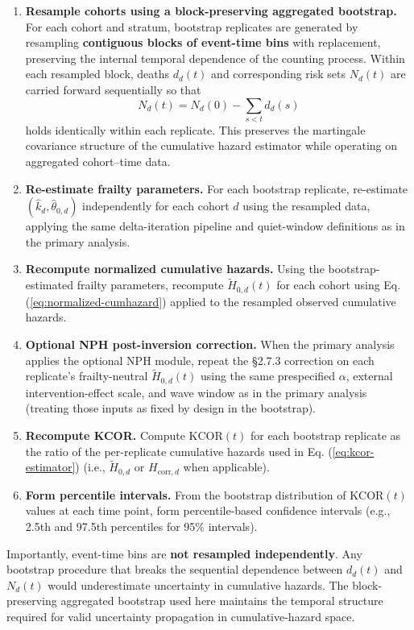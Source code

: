 \documentclass[
]{article}
\begin{document}
\begin{enumerate}
\def\labelenumi{\arabic{enumi}.}
\item
  \textbf{Resample cohorts using a block-preserving aggregated
  bootstrap.}\\
  For each cohort and stratum, bootstrap replicates are generated by
  resampling \textbf{contiguous blocks of event-time bins} with
  replacement, preserving the internal temporal dependence of the
  counting process. Within each resampled block, deaths \(d_d(t)\) and
  corresponding risk sets \(N_d(t)\) are carried forward sequentially so
  that \[
  N_d(t)=N_d(0)-\sum_{s<t} d_d(s)
  \] holds identically within each replicate. This preserves the
  martingale covariance structure of the cumulative hazard estimator
  while operating on aggregated cohort--time data.
\item
  \textbf{Re-estimate frailty parameters.} For each bootstrap replicate,
  re-estimate \((\hat{k}_d,\hat{\theta}_{0,d})\) independently for each
  cohort \(d\) using the resampled data, applying the same
  delta-iteration pipeline and quiet-window definitions as in the
  primary analysis.
\item
  \textbf{Recompute normalized cumulative hazards.} Using the
  bootstrap-estimated frailty parameters, recompute
  \(\tilde H_{0,d}(t)\) for each cohort using Eq.
  (\ref{eq:normalized-cumhazard}) applied to the resampled observed
  cumulative hazards.
\item
  \textbf{Optional NPH post-inversion correction.} When the primary
  analysis applies the optional NPH module, repeat the §2.7.3 correction
  on each replicate's frailty-neutral \(\tilde H_{0,d}(t)\) using the
  same prespecified \(\alpha\), external intervention-effect scale, and
  wave window as in the primary analysis (treating those inputs as fixed
  by design in the bootstrap).
\item
  \textbf{Recompute KCOR.} Compute \(\mathrm{KCOR}(t)\) for each
  bootstrap replicate as the ratio of the per-replicate cumulative
  hazards used in Eq. (\ref{eq:kcor-estimator}) (i.e.,
  \(\tilde H_{0,d}\) or \(H_{\mathrm{corr},d}\) when applicable).
\item
  \textbf{Form percentile intervals.} From the bootstrap distribution of
  \(\mathrm{KCOR}(t)\) values at each time point, form percentile-based
  confidence intervals (e.g., 2.5th and 97.5th percentiles for 95\%
  intervals).
\end{enumerate}

Importantly, event-time bins are \textbf{not resampled independently}.
Any bootstrap procedure that breaks the sequential dependence between
\(d_d(t)\) and \(N_d(t)\) would underestimate uncertainty in cumulative
hazards. The block-preserving aggregated bootstrap used here maintains
the temporal structure required for valid uncertainty propagation in
cumulative-hazard space.
\end{document}
